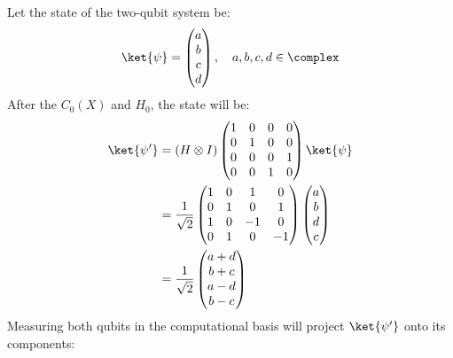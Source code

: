 \begingroup
\newcommand{\ketbra}[2]{\ket{#1} \bra{#2}}
%
\par Let the state of the two-qubit system be:
$$
\ket{\psi} = \begin{pmatrix} a \\ b \\ c \\ d \end{pmatrix}, \quad a, b, c, d \in \complex
$$
%
After the $C_0 \left( X \right)$ and $H_0$, the state will be:
%
\begin{align*}
\ket{\psi'} &= \left( H \otimes I \right) \begin{pmatrix} 1 & 0 & 0 & 0 \\ 0 & 1 & 0 & 0 \\ 0 & 0 & 0 & 1 \\ 0 & 0 & 1 & 0 \end{pmatrix} \ket{\psi} \\
&= \frac{1}{\sqrt{2}} \begin{pmatrix} 1 & 0 & 1 & 0 \\ 0 & 1 & 0 & 1 \\ 1 & 0 & -1 & 0 \\ 0 & 1 & 0 & -1 \end{pmatrix} \begin{pmatrix} a \\ b \\ d \\ c \end{pmatrix} \\
&= \frac{1}{\sqrt{2}} \begin{pmatrix} a + d \\ b + c \\ a - d \\ b - c \end{pmatrix}
\end{align*}
%
Measuring both qubits in the computational basis will project $\ket{\psi'}$ onto its components:
%
